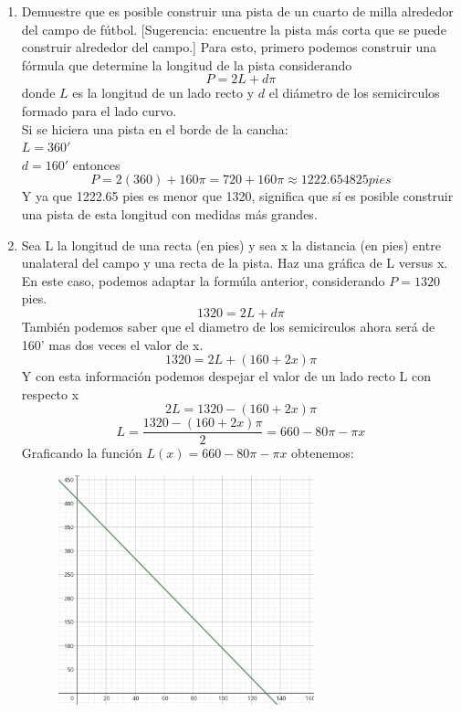 \documentclass[12pt]{article}
\begin{document}
\begin{enumerate}[label=\alph*)]
\item Demuestre que es posible construir una pista de un cuarto de milla
alrededor del campo de fútbol. [Sugerencia: encuentre la
pista más corta que se puede construir alrededor del campo.]
Para esto, primero podemos construir una fórmula que determine la longitud de la pista considerando
\[
P = 2L + d\pi 
\]
donde $L$ es la longitud de un lado recto y $d$ el diámetro de los semicirculos formado para el lado curvo.\\
Si se hiciera una pista en el borde de la cancha:\\
$L = 360 '$\\
$d=160'$
entonces
\[
P = 2(360) + 160 \pi= 720 + 160\pi \approx 1222.654825 pies
\]
Y ya que 1222.65 pies es menor que 1320, significa que sí es posible construir una pista de esta longitud con medidas más grandes.

\item Sea L la longitud de una recta (en pies) y sea x
la distancia (en pies) entre unalateral del campo y una recta de la pista. Haz una gráfica de L versus x. \\
En este caso, podemos adaptar la formúla anterior, considerando $P=1320$ pies.
\[
1320 = 2L + d\pi  
\]
También podemos saber que el diametro de los semicirculos ahora será de 160' mas dos veces el valor de x.
\[
1320 = 2L + (160+2x)\pi  
\]
Y con esta información podemos despejar el valor de un lado recto L con respecto x
\[
2L = 1320 - (160+2x)\pi  
\]
\[
L =\frac{ 1320 - (160+2x)\pi  }{2} = 660-80 \pi -\pi x 
\]
Graficando la función $L(x) =  660-80 \pi -\pi x $ obtenemos:
\begin{figure}[h]
\centering
\includegraphics[width=0.7\textwidth]{img/pista.png}
\end{figure}


\end{enumerate}
\end{document}
